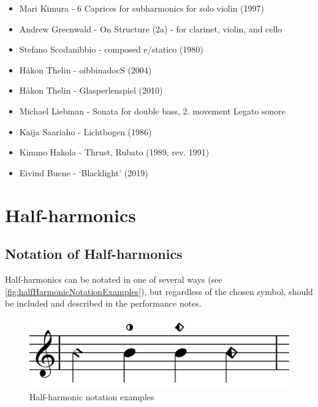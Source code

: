\begin{itemize}
    \item Mari Kimura - 6 Caprices for subharmonics for solo violin (1997) 
    \item Andrew Greenwald - On Structure (2a) - for clarinet, violin, and cello
    \item Stefano Scodanibbio - composed e/statico (1980)
    \item Håkon Thelin - oibbinadocS (2004)
    \item Håkon Thelin - Glasperlenspiel (2010)
    \item Michael Liebman - Sonata for double bass, 2. movement Legato sonore
    \item Kaija Saariaho - Lichtbogen (1986)
    \item Kimmo Hakola - Thrust, Rubato (1989, rev. 1991) 
    \item Eivind Buene - `Blacklight' (2019)
\end{itemize}

\section{Half-harmonics} \label{sec:half-harmonics}

\subsection{Notation of Half-harmonics} \label{sec:notation-half-harmonics}
Half-harmonics can be notated in one of several ways (see \autoref{fig:halfHarmonicNotationExamples}), but regardless of the chosen symbol, should be included and described in the performance notes.


\begin{figure}
    \includegraphics[width=\linewidth]{./resources/halfHarmonicNotationExamples.pdf}
    \caption{Half-harmonic notation examples} \label{fig:halfHarmonicNotationExamples}
  \end{figure}

